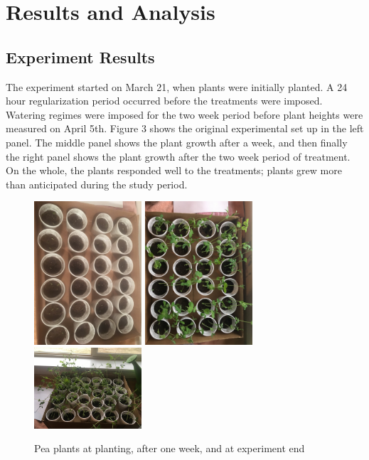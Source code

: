 \documentclass[1p,12pt]{elsarticle}\usepackage[]{graphicx}\usepackage[]{color}
\begin{document}
\section{Results and Analysis}
\subsection{Experiment Results}

The experiment started on March 21, when plants were initially planted. A 24 hour regularization period occurred before the treatments were imposed. Watering regimes were imposed for the two week period before plant heights were measured on April 5th. Figure 3 shows the original experimental set up in the left panel. The middle panel shows the plant growth after a week, and then finally the right panel shows the plant growth after the two week period of treatment.  On the whole, the plants responded well to the treatments; plants grew more than anticipated during the study period. 
 \begin{figure}[h!]
 	\caption{Pea plants at planting, after one week, and at experiment end}
 	\centering
	\includegraphics[width = 4cm]{figure/initial_growth.JPG}
	\includegraphics[width = 4cm]{figure/lategrowth.JPG}
	\includegraphics[width = 4cm]{figure/2weeks.JPG}
\end{figure}
\end{document}
